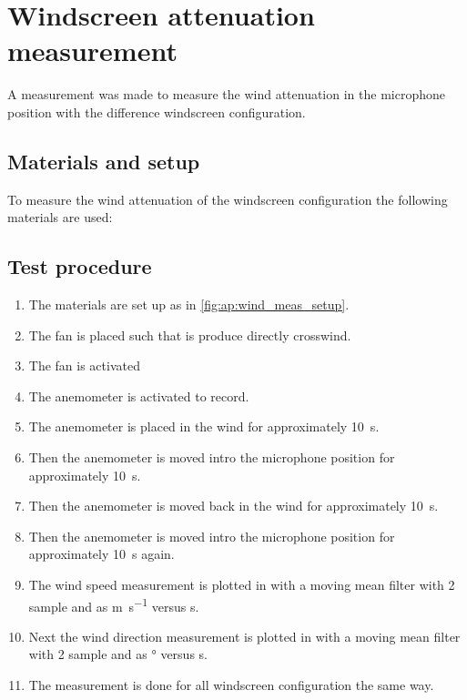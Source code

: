 \chapter{Windscreen attenuation measurement}
A measurement was made to measure the wind attenuation in the microphone position with the difference windscreen configuration.


\section*{Materials and setup}
To measure the wind attenuation of the windscreen configuration the following materials are used:

\startequipment
{}
\stopequipment




\section*{Test procedure}


\begin{enumerate}
\item The materials are set up as in \autoref{fig:ap:wind_meas_setup}.
\item The fan is placed such that is produce directly crosswind.
\item The fan is activated 
\item The anemometer is activated to record.
\item The anemometer is placed in the wind for approximately \SI{10}{\second}.
\item Then the anemometer is moved intro the microphone position for approximately \SI{10}{\second}.
\item Then the anemometer is moved back in the wind for approximately \SI{10}{\second}.
\item Then the anemometer is moved intro the microphone position for approximately \SI{10}{\second} again. 
\item The wind speed measurement is plotted in \matlab with a moving mean filter with 2 sample and as \si{\meter\per\second} versus \si{\second}.
\item Next the wind direction measurement is plotted in \matlab with a moving mean filter with 2 sample and as \si{\degree} versus \si{\second}.
\item The measurement is done for all windscreen configuration the same way.
\end{enumerate}


